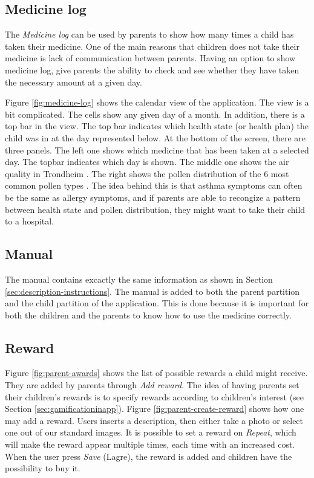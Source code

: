 \subsection{Medicine log}
\label{sec:description-medicine-log}
The \emph{Medicine log} can be used by parents to show how many times a child has taken their medicine. One of the main reasons that children does not take their medicine is lack of communication between parents. Having an option to show medicine log, give parents the ability to check and see whether they have taken the necessary amount at a given day.

Figure \ref{fig:medicine-log} shows the calendar view of the application. The view is a bit complicated. The cells show any given day of a month. In addition, there is a top bar in the view. The top bar indicates which health state (or health plan) the child was in at the day represented below. At the bottom of the screen, there are three panels. The left one shows which medicine that has been taken at a selected day. The topbar indicates which day is shown. The middle one shows the air quality in Trondheim . The right shows the pollen distribution of the 6 most common pollen types . The idea behind this is that asthma symptoms can often be the same as allergy symptoms, and if parents are able to recongize a pattern between health state and pollen distribution, they might want to take their child to a hospital.    


\subsection{Manual}
\label{sec:description-manual}
The manual contains excactly the same information as shown in Section \ref{sec:description-instructions}. The manual is added to both the parent partition and the child partition of the application. This is done because it is important for both the children and the parents to know how to use the medicine correctly. 


\subsection{Reward}
\label{sec:description-manage-rewards}
Figure \ref{fig:parent-awards} shows the list of possible rewards a child might receive. They are added by parents through \emph{Add reward}. The idea of having parents set their children's rewards is to specify rewards according to children's interest (see Section \ref{sec:gamificationinapp}). Figure \ref{fig:parent-create-reward} shows how one may add a reward. Users inserts a description, then either take a photo or select one out of our standard images. It is possible to set a reward on \emph{Repeat}, which will make the reward appear multiple times, each time with an increased cost.        
When the user press \emph{Save} (Lagre), the reward is added and children have the possibility to buy it. 
 
